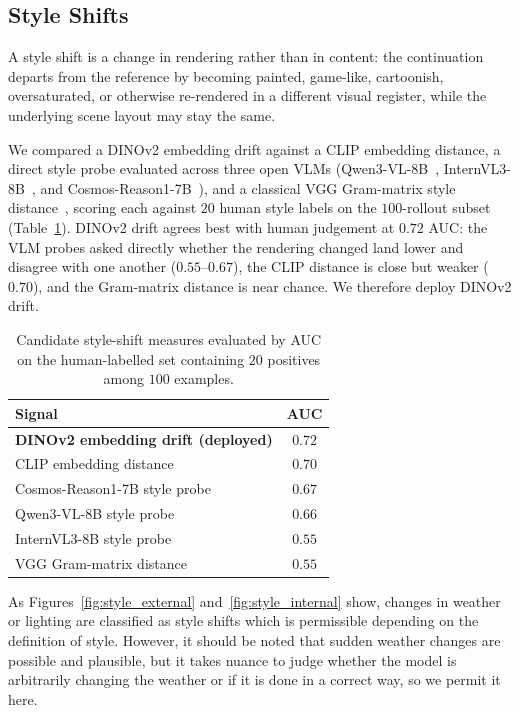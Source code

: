 \documentclass[letterpaper]{article} %
\begin{document}
\subsection{Style Shifts}
\label{app:val_style}

A style shift is a change in rendering rather than in content:
the continuation departs from the reference by becoming painted, game-like,
cartoonish, oversaturated, or otherwise re-rendered in a different visual
register, while the underlying scene layout may stay the same.

We compared a DINOv2 embedding drift against a CLIP embedding distance, a direct
style probe evaluated across three open VLMs (Qwen3-VL-8B~\cite{QWEN},
InternVL3-8B~\cite{internvl3}, and Cosmos-Reason1-7B~\cite{cosmos2}), and a
classical VGG Gram-matrix style distance~\cite{gatys2016image}, scoring each against
$20$ human style labels on the $100$-rollout subset
(Table~\ref{tab:style_metric_auc}). DINOv2 drift agrees best with human judgement
at $0.72$ AUC: the VLM probes asked directly whether the rendering changed land
lower and disagree with one another ($0.55$--$0.67$), the CLIP distance is close
but weaker ($0.70$), and the Gram-matrix distance is near chance. We therefore
deploy DINOv2 drift.

\begin{table}[t]
\centering
{
\small
\begin{tabular}{lc}
\toprule
Signal & AUC \\
\midrule
\textbf{DINOv2 embedding drift (deployed)} & $\mathbf{0.72}$ \\
CLIP embedding distance                    & $0.70$ \\
Cosmos-Reason1-7B style probe              & $0.67$ \\
Qwen3-VL-8B style probe                    & $0.66$ \\
InternVL3-8B style probe                   & $0.55$ \\
VGG Gram-matrix distance                   & $0.55$ \\
\bottomrule
\end{tabular}
}
\caption{
    Candidate style-shift measures evaluated by AUC on the human-labelled set
    containing $20$ positives among $100$ examples.
}
\label{tab:style_metric_auc}
\end{table}

As Figures~\ref{fig:style_external} and~\ref{fig:style_internal}
show, changes in weather or lighting are classified as style shifts which is permissible depending on the definition of style. However, it should be noted that sudden weather changes are possible and plausible, but it takes nuance to judge whether the model is arbitrarily changing the weather or if it is done in a correct way, so we permit it here.
\end{document}
